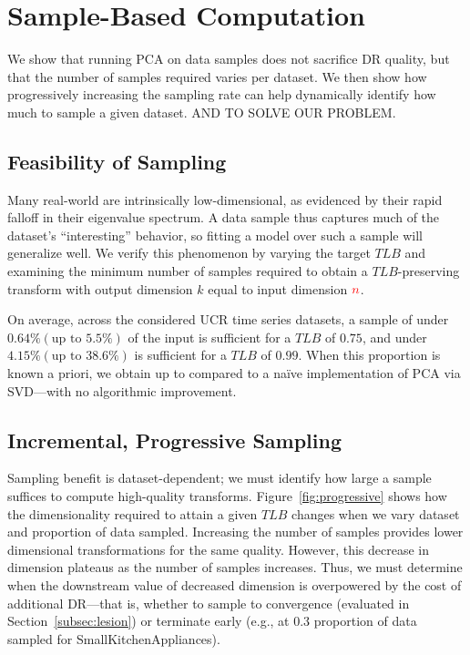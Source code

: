 \section{Sample-Based Computation}
\label{sec:sampling}

We  show that running PCA on data samples does not sacrifice DR quality, but that the number of samples required varies per dataset.
We then show how progressively increasing the sampling rate can help dynamically identify how much to sample a given dataset. AND TO SOLVE OUR PROBLEM.

\subsection{Feasibility of Sampling}
Many real-world  are intrinsically low-dimensional, as evidenced by their rapid falloff in their eigenvalue spectrum.
A data sample thus captures much of the dataset's ``interesting'' behavior, so fitting a model over such a sample will generalize well. We verify this phenomenon by varying the target $TLB$ and examining the minimum number of samples required to obtain a $TLB$-preserving transform with output dimension $k$ equal to input dimension ${\color{red}n}$.

On average, across the considered UCR time series datasets, a sample of under $0.64\% (\text{up to } 5.5\%)$ of the input is sufficient for a $TLB$ of $0.75$, and under $4.15\% (\text{up to } 38.6\%)$ is sufficient for a $TLB$ of $0.99$.  
When this proportion is known a priori, we obtain up to  compared to a na\"ive implementation of PCA via SVD---with no algorithmic improvement. 


\subsection{Incremental, Progressive Sampling}
Sampling benefit is dataset-dependent; we must identify how large a sample suffices to compute high-quality transforms.
Figure~\ref{fig:progressive} shows how the dimensionality required to attain a given $TLB$ changes when we vary dataset and proportion of data sampled.
Increasing the number of samples provides lower dimensional transformations for the same quality.
However, this decrease in dimension plateaus as the number of samples increases.
Thus, we must determine when the downstream value of decreased dimension is overpowered by the cost of additional DR---that is, whether to sample to convergence (evaluated in Section~\ref{subsec:lesion}) or terminate early (e.g., at $0.3$ proportion of data sampled for SmallKitchenAppliances). 


